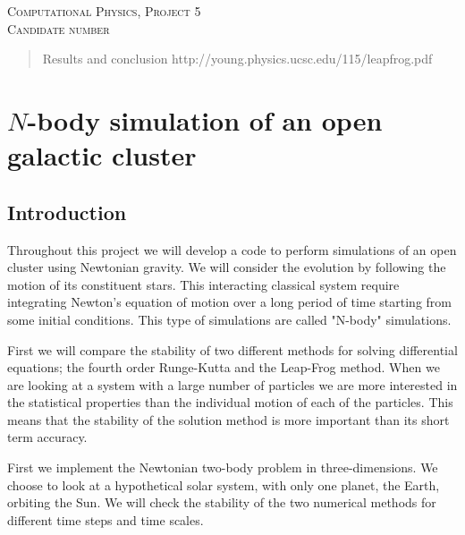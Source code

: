 \documentclass[a4paper,12pt, english]{article}
\begin{document}
\begin{titlepage}
\begin{center}
\textsc{\Large Computational Physics, Project 5}\\[0.5cm]
\textsc{Candidate number}\\[0.5cm]

\end{center}
\end{titlepage}

\begin{abstract}
Results and conclusion
http://young.physics.ucsc.edu/115/leapfrog.pdf
\end{abstract}

\section*{$N$-body simulation of an open galactic cluster}

\subsection*{Introduction}

Throughout this project we will develop a code to perform simulations of an open cluster using Newtonian gravity. We will consider the evolution by following the motion of its constituent stars. This interacting classical system require integrating Newton's equation of motion over a long period of time starting from some initial conditions. This type of simulations are called "N-body" simulations. 

First we will compare the stability of two different methods for solving differential equations; the fourth order Runge-Kutta and the Leap-Frog method. When we are looking at a system with a large number of particles we are more interested in the statistical properties than the individual motion of each of the particles. This means that the stability of the solution method is more important than its short term accuracy.

First we implement the Newtonian two-body problem in three-dimensions. We choose to look at a hypothetical solar system, with only one planet, the Earth, orbiting the Sun. We will check the stability of the two numerical methods for different time steps and time scales. 
\end{document}
